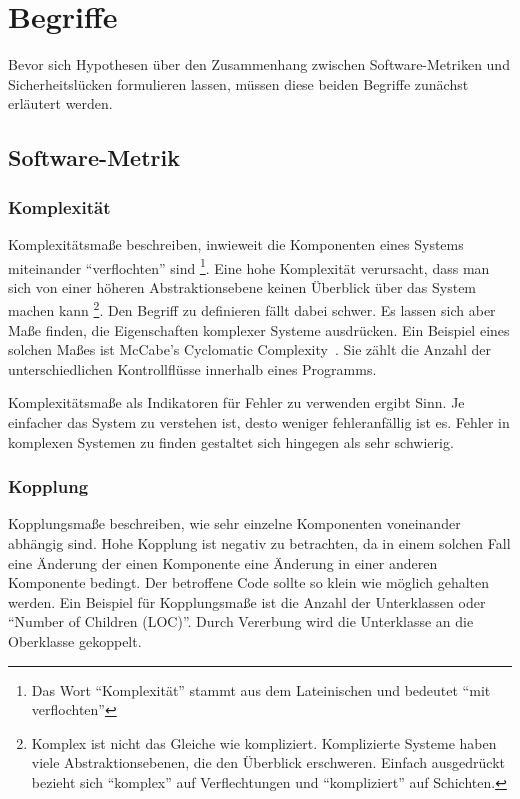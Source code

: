 \section{Begriffe}
\label{sec:begriffe}
Bevor sich Hypothesen über den Zusammenhang zwischen Software-Metriken und Sicherheitslücken formulieren lassen, müssen diese beiden Begriffe zunächst erläutert werden.
\subsection{Software-Metrik}

\subsubsection{Komplexität}
Komplexitätsmaße beschreiben, inwieweit die Komponenten eines Systems miteinander "`verflochten"' sind
\footnote{Das Wort "`Komplexität"' stammt aus dem Lateinischen und bedeutet "`mit verflochten"'}.
Eine hohe Komplexität verursacht, dass man sich von einer höheren Abstraktionsebene keinen Überblick über das System machen kann
\footnote{Komplex ist nicht das Gleiche wie kompliziert. Komplizierte Systeme haben viele Abstraktionsebenen, die den Überblick erschweren. Einfach ausgedrückt bezieht sich "`komplex"' auf Verflechtungen und "`kompliziert"' auf Schichten.}.
Den Begriff zu definieren fällt dabei schwer.
Es lassen sich aber Maße finden, die Eigenschaften komplexer Systeme ausdrücken.
Ein Beispiel eines solchen Maßes ist McCabe's Cyclomatic Complexity~\cite{mccabe1976}.
Sie zählt die Anzahl der unterschiedlichen Kontrollflüsse innerhalb eines Programms.

Komplexitätsmaße als Indikatoren für Fehler zu verwenden ergibt Sinn.
Je einfacher das System zu verstehen ist, desto weniger fehleranfällig ist es.
Fehler in komplexen Systemen zu finden gestaltet sich hingegen als sehr schwierig.

\subsubsection{Kopplung}
Kopplungsmaße beschreiben, wie sehr einzelne Komponenten voneinander abhängig sind.
Hohe Kopplung ist negativ zu betrachten, da in einem solchen Fall eine Änderung der einen Komponente eine Änderung in einer anderen Komponente bedingt.
Der betroffene Code sollte so klein wie möglich gehalten werden.
Ein Beispiel für Kopplungsmaße ist die Anzahl der Unterklassen oder "`Number of Children (LOC)"'.
Durch Vererbung wird die Unterklasse an die Oberklasse gekoppelt.

